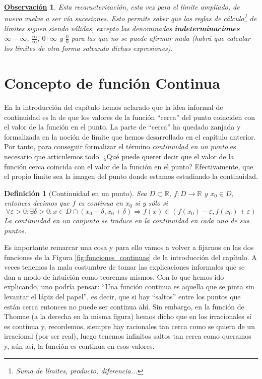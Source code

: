 \documentclass[10pt,a4paper,openright]{book}
\theoremstyle{break}
\newtheorem{defi}{Definición}[chapter]
\newtheorem{obs}{\underline{Observación}}[chapter]
\begin{document}
\begin{obs}
Esta recaracterización, esta vez para el límite ampliado, de nuevo vuelve a ser vía sucesiones. Esto permite saber que las reglas de cálculo\footnote{Suma de límites, producto, diferencia...} de límites siguen siendo válidas, excepto las denominadas \textbf{indeterminaciones} $\infty-\infty$, $\frac{\infty}{\infty}$, $0\cdot \infty$ y $\frac{0}{0}$ para las que no se puede afirmar nada (habrá que calcular los límites de otra forma salvando dichas expresiones).
\end{obs}

\section{Concepto de función Continua}
En la introducción del capítulo hemos aclarado que la idea informal de continuidad es la de que los valores de la función ``cerca'' del punto coinciden con el valor de la función en el punto. La parte de ``cerca'' ha quedado zanjada y formalizada en la noción de límite que hemos desarrollado en el capítulo anterior. Por tanto, para conseguir formalizar el término \textit{continuidad en un punto} es necesario que articulemos todo. ¿Qué puede querer decir que el valor de la función cerca coincida con el valor de la función en el punto? Efectivamente, que el propio límite sea la imagen del punto donde estamos estudiando la continuidad.

\begin{defi}[Continuidad en un punto]
Sea $D\subset \mathbb R$, $f: D\longrightarrow \mathbb R$ y $x_0\in D$, entonces decimos que $f$ es continua en $x_0$ si y sólo si
$$\forall \varepsilon >0 : \exists \delta >0: x\in D\cap (x_0-\delta, x_0+\delta)\Rightarrow f(x)\in (f(x_0)-\varepsilon, f(x_0)+\varepsilon)$$
La continuidad en un conjunto se traduce en la continuidad en cada uno de sus puntos.
\end{defi}

Es importante remarcar una cosa y para ello vamos a volver a fijarnos en las dos funciones de la Figura \ref{fig:funciones_continuas} de la introducción del capítulo. A veces tenemos la mala costumbre de tomar las explicaciones informales que se dan a modo de intuición como teoremas mismos. Con lo que hemos ido explicando, uno podría pensar: ``Una función continua es aquella que se pinta sin levantar el lápiz del papel'', es decir, que si hay ``saltos'' entre los puntos que están cerca entonces no puede ser continua ahí. Sin embargo, en la función de Thomae (a la derecha en la misma figura) hemos dicho que en los irracionales sí es continua y, recordemos, siempre hay racionales tan cerca como se quiera de un irracional (por ser real), luego tenemos infinitos saltos tan cerca como queramos y, aún así, la función es continua en esos valores.
\end{document}
